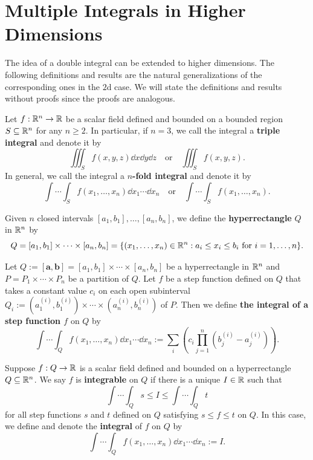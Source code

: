 \section{Multiple Integrals in Higher Dimensions}
The idea of a double integral can be extended to higher dimensions. The following definitions and results are the natural generalizations of the corresponding ones in the $2$d case. We will state the definitions and results without proofs since the proofs are analogous.
\begin{definitionenv}
    Let $f: \mathbb{R}^n \to \mathbb{R}$ be a scalar field defined and bounded on a bounded region $S \subseteq \mathbb{R}^n$ for any $n \geq 2$. In particular, if $n=3$, we call the integral a \textbf{triple integral} and denote it by
$$ \iiint_S f(x,y,z) \dd x \dd y \dd z\quad \text{or} \quad \iiint_S f(x,y,z). $$
In general, we call the integral a \textbf{$n$-fold integral} and denote it by
$$ \int \cdots \int_S f(x_1, \ldots, x_n) \dd x_1 \cdots \dd x_n \quad \text{or} \quad \int \cdots \int_S f(x_1, \ldots, x_n). $$
\end{definitionenv}
\begin{definitionenv}
    Given $n$ closed intervals $[a_1, b_1], \ldots, [a_n, b_n]$, we define the \textbf{hyperrectangle} $Q$ in $\mathbb{R}^n$ by
$$ Q = [a_1, b_1] \times \cdots \times [a_n, b_n] = \{(x_1, \ldots, x_n) \in \mathbb{R}^n : a_i \leq x_i \leq b_i \text{ for } i = 1, \ldots, n\}. $$
\end{definitionenv}
\begin{definitionenv}
    Let $Q:= [\bm a, \bm b] = [a_1, b_1] \times \cdots \times [a_n, b_n]$ be a hyperrectangle in $\mathbb{R}^n$ and $P = P_1 \times \cdots \times P_n$ be a partition of $Q$. Let $f$ be a step function defined on $Q$ that takes a constant value $c_i$ on each open subinterval $Q_i := (a_1^{(i)}, b_1^{(i)}) \times \cdots \times (a_n^{(i)}, b_n^{(i)})$ of $P$. Then we define \textbf{the integral of a step function $f$} on $Q$ by
    $$ \int \cdots \int_Q f(x_1, \ldots, x_n) \dd x_1 \cdots \dd x_n := \sum_i\left(  c_i \prod_{j=1}^n (b_j^{(i)} - a_j^{(i)}) \right). $$
\end{definitionenv}
\begin{definitionenv}
    Suppose $f: Q \to \mathbb{R}$ is a scalar field defined and bounded on a hyperrectangle $Q\subseteq \mathbb{R}^n$. We say $f$ is \textbf{integrable} on $Q$ if there is a unique $I \in \mathbb{R}$ such that
    $$
    \int \cdots \int_Q s \leq I \leq \int \cdots \int_Q t
    $$
    for all step functions $s$ and $t$ defined on $Q$ satisfying $s \leq f \leq t$ on $Q$. In this case, we define and denote the \textbf{integral} of $f$ on $Q$ by
    $$
    \int \cdots \int_Q f(x_1, \ldots, x_n) \dd x_1 \cdots \dd x_n := I.
    $$
\end{definitionenv}
